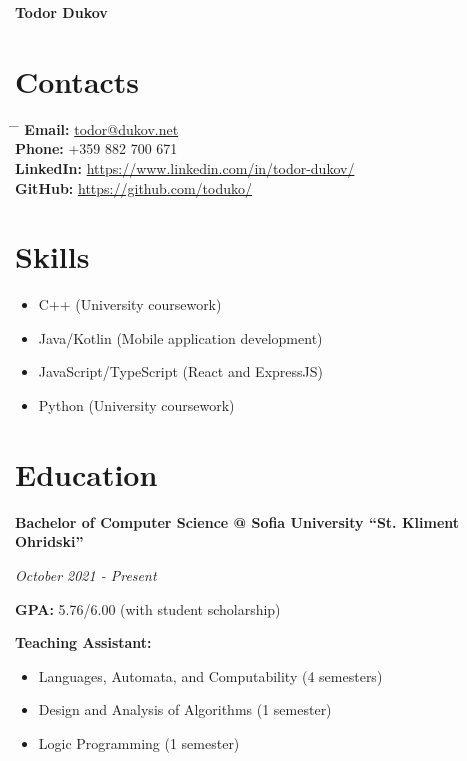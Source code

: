 \documentclass[a4paper,10pt]{article}
\begin{document}
\begin{center}
    \huge{\textbf{Todor Dukov}}
\end{center}

\begin{multicols}{2}
    \section*{Contacts}

    \begin{tabbing}
        \hspace{2cm} \= \hspace{8cm} \= \kill
        \textbf{Email:} \> \href{mailto:todor@dukov.net}{todor@dukov.net} \\
        \textbf{Phone:} \> +359 882 700 671 \\
        \textbf{LinkedIn:} \> \href{https://www.linkedin.com/in/todor-dukov/}{https://www.linkedin.com/in/todor-dukov/} \\
        \textbf{GitHub:} \> \href{https://github.com/toduko/}{https://github.com/toduko/} \\
    \end{tabbing}

    \section*{Skills}

    \begin{itemize}
        \item C++ (University coursework)
        \item Java/Kotlin (Mobile application development)
        \item JavaScript/TypeScript (React and ExpressJS)
        \item Python (University coursework)
    \end{itemize}
\end{multicols}

\section*{Education}

\textbf{Bachelor of Computer Science @ Sofia University “St. Kliment Ohridski”}

\textit{October 2021 - Present}

\textbf{GPA:} 5.76/6.00 (with student scholarship)

\textbf{Teaching Assistant:}
\begin{itemize}
    \item Languages, Automata, and Computability (4 semesters)
    \item Design and Analysis of Algorithms (1 semester)
    \item Logic Programming (1 semester)
\end{itemize}
\end{document}
